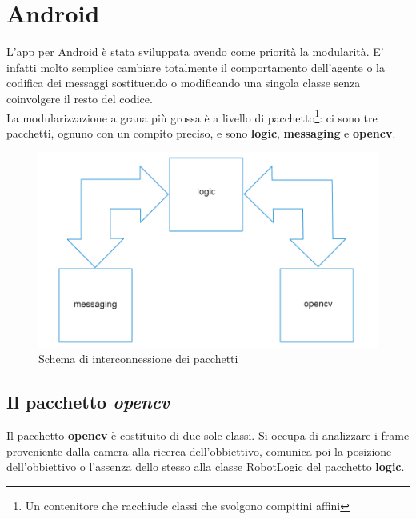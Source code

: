 \section {Android}
L'app per Android è stata sviluppata avendo come priorità la modularità. E' 
infatti molto semplice cambiare totalmente il comportamento dell'agente o la 
codifica dei messaggi sostituendo o modificando una singola classe senza 
coinvolgere il resto del codice.\\
La modularizzazione a grana più grossa è a livello di pacchetto\footnote{Un contenitore 
che racchiude classi che svolgono compitini affini}: ci sono tre pacchetti,
ognuno con un compito preciso, e sono \textbf{logic}, \textbf{messaging} e \textbf{opencv}.
\begin{figure}[H] \center
\includegraphics[scale=0.2]{immagini/package_diagram.png}
\caption{Schema di interconnessione dei pacchetti} 
\end{figure}

\subsection {Il pacchetto \textit{opencv}}
Il pacchetto \textbf{opencv} è costituito di due sole classi. Si occupa di analizzare 
i frame proveniente dalla camera alla ricerca dell'obbiettivo, comunica poi la posizione 
dell'obbiettivo o l'assenza dello stesso alla classe RobotLogic del pacchetto 
\textbf{logic}.
